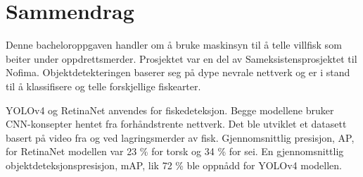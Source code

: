\section*{Sammendrag}










Denne bacheloroppgaven handler om å bruke maskinsyn til å telle villfisk som beiter under oppdrettsmerder. Prosjektet var en del av Sameksistensprosjektet til Nofima. Objektdetekteringen baserer seg på dype nevrale nettverk og er i stand til å klassifisere og telle forskjellige fiskearter.

YOLOv4 og RetinaNet anvendes for fiskedeteksjon. Begge modellene bruker CNN-konsepter hentet fra forhåndstrente nettverk. Det ble utviklet et datasett basert på video fra og ved lagringsmerder av fisk. Gjennomsnittlig presisjon, AP, for RetinaNet modellen var 23 \% for torsk og 34 \% for sei. En gjennomsnittlig objektdeteksjonspresisjon, mAP, lik 72 \% ble oppnådd for YOLOv4 modellen.


